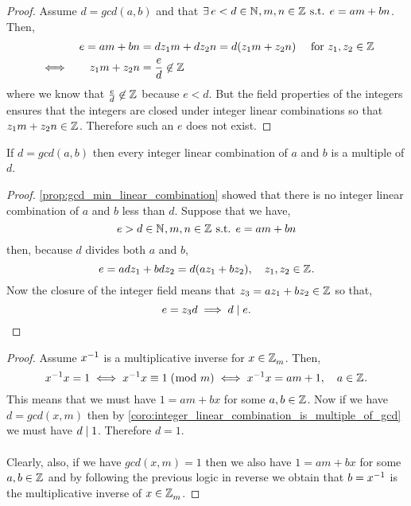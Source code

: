 \documentclass[MathsNotesBase.tex]{subfiles}
\begin{document}
{		
		\begin{proof}
			Assume $d = gcd(a,b)$ and that ${ \exists\, e < d \in \mathbb{N}^{}, m,n \in \mathbb{Z}^{} \text{ s.t. } e = am + bn }$. Then,
			\begin{align*}
				&&e = am + bn &= dz_1m + dz_2n = d(z_1m + z_2n) \hspace{10pt} \text{ for } z_1, z_2 \in \mathbb{Z}^{} \\
				&\iff &z_1m + z_2n &= \frac{e}{d} \not\in \mathbb{Z}^{}
			\end{align*}
			where we know that ${ \frac{e}{d} \not\in \mathbb{Z}^{} }$ because ${ e < d }$. But the field properties of the integers ensures that the integers are closed under integer linear combinations so that $z_1m + z_2n \in \mathbb{Z}^{}$. Therefore such an $e$ does not exist.
		\end{proof}
	
		\begin{corollary}
			\label{coro:integer_linear_combination_is_multiple_of_gcd}
			If $d = gcd(a, b)$ then every integer linear combination of $a$ and $b$ is a multiple of $d$.
		\end{corollary}
		\begin{proof}
			\autoref{prop:gcd_min_linear_combination} showed that there is no integer linear combination of $a$ and $b$ less than $d$. Suppose that we have,
			\[ e > d  \in \mathbb{N}^{}, m,n \in \mathbb{Z}^{} \text{ s.t. } e = am + bn \]
			then, because $d$ divides both $a$ and $b$,
			\[ e = adz_1 + bdz_2 = d(az_1 + bz_2), \hspace{10pt} z_1,z_2 \in \mathbb{Z}^{}. \]
			Now the closure of the integer field means that ${ z_3 = az_1 + bz_2 \in \mathbb{Z}^{} }$ so that,
			\[ e = z_3d \implies d \mid e. \]
		\end{proof}
	
		\begin{proof}
			Assume ${ {x}^{-1} }$ is a multiplicative inverse for ${ x \in \mathbb{Z}^{}_m }$. Then,
			\[ {x}^{-1}x = 1 \iff {x}^{-1}x \equiv 1 \;(\bmod\; m) \iff {x}^{-1}{x} = am + 1, \hspace{10pt} a \in \mathbb{Z}^{}. \]
			This means that we must have ${ 1 = am + bx }$ for some ${ a,b \in \mathbb{Z}^{} }$. Now if we have ${ d = gcd(x,m) }$ then by \autoref{coro:integer_linear_combination_is_multiple_of_gcd} we must have ${ d \mid 1 }$. Therefore ${ d = 1 }$.\\\\
			Clearly, also, if we have ${ gcd(x,m) = 1 }$ then we also have ${ 1 = am + bx }$ for some ${ a,b \in \mathbb{Z}^{} }$ and by following the previous logic in reverse we obtain that ${ b = {x}^{-1} }$ is the multiplicative inverse of ${ x \in \mathbb{Z}^{}_m }$.
		\end{proof}
	
}
\end{document}
